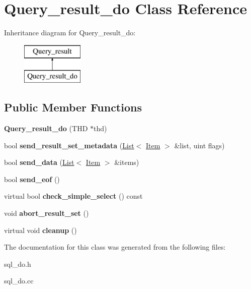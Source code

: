 \hypertarget{classQuery__result__do}{}\section{Query\+\_\+result\+\_\+do Class Reference}
\label{classQuery__result__do}
Inheritance diagram for Query\+\_\+result\+\_\+do\+:\begin{figure}[H]
\begin{center}
\leavevmode
\includegraphics[height=2.000000cm]{classQuery__result__do}
\end{center}
\end{figure}
\subsection*{Public Member Functions}
\begin{DoxyCompactItemize}
\item 
\mbox{\label{classQuery__result__do_a4010e313e8d1b7b2db058f9169741523}} 
{\bfseries Query\+\_\+result\+\_\+do} (T\+HD $\ast$thd)
\item 
\mbox{\label{classQuery__result__do_a9ac061c130009ebeda79d60375087002}} 
bool {\bfseries send\+\_\+result\+\_\+set\+\_\+metadata} (\mbox{\hyperlink{classList}{List}}$<$ \mbox{\hyperlink{classItem}{Item}} $>$ \&list, uint flags)
\item 
\mbox{\label{classQuery__result__do_a407ba40485b43799149ee37007791884}} 
bool {\bfseries send\+\_\+data} (\mbox{\hyperlink{classList}{List}}$<$ \mbox{\hyperlink{classItem}{Item}} $>$ \&items)
\item 
\mbox{\label{classQuery__result__do_a76ddce0c3aa7d5acb038dd93f490f923}} 
bool {\bfseries send\+\_\+eof} ()
\item 
\mbox{\label{classQuery__result__do_a92d460aca3ee2d889b5005b5f4f8728a}} 
virtual bool {\bfseries check\+\_\+simple\+\_\+select} () const
\item 
\mbox{\label{classQuery__result__do_a65d5b6d4cc70442ce4124124c88d5fa7}} 
void {\bfseries abort\+\_\+result\+\_\+set} ()
\item 
\mbox{\label{classQuery__result__do_ae24f5f9d0e265cfc98eb009254eacb54}} 
virtual void {\bfseries cleanup} ()
\end{DoxyCompactItemize}


The documentation for this class was generated from the following files\+:\begin{DoxyCompactItemize}
\item 
sql\+\_\+do.\+h\item 
sql\+\_\+do.\+cc\end{DoxyCompactItemize}
